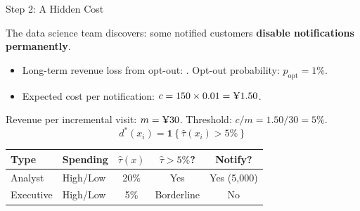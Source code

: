 \documentclass[aspectratio=169, 11pt, handout]{beamer}
\begin{document}
\begin{frame}{Step 2: A Hidden Cost}

The data science team discovers: some notified customers \textbf{disable notifications permanently}.

\medskip

\begin{itemize}
    \item Long-term revenue loss from opt-out: . Opt-out probability: $p_{\text{opt}} = 1\%$.
    \item Expected cost per notification: $c = 150 \times 0.01 = \text{\textyen}1.50$.
\end{itemize}

\pause
\medskip

Revenue per incremental visit: $m = \text{\textyen}30$. Threshold: $c/m = 1.50/30 = 5\%$.
\[
d^*(x_i) = \mathbf{1}\left\{\hat{\tau}(x_i) > 5\%\right\}
\]

\pause
\medskip

\begin{center}
\begin{tabular}{llccc}
\toprule
\textbf{Type} & \textbf{Spending} & $\hat{\tau}(x)$ & $\hat{\tau} > 5\%$? & \textbf{Notify?} \\
\midrule
Analyst & High/Low & 20\% & \textcolor{sbgreen}{Yes} & \textcolor{sbgreen}{Yes (5,000)} \\
Executive & High/Low & 5\% & \textcolor{warnred}{Borderline} & \textcolor{warnred}{No} \\
\bottomrule
\end{tabular}
\end{center}

\end{frame}
\end{document}
